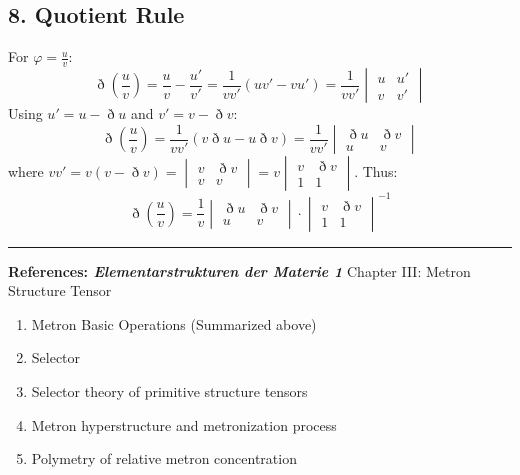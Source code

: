 \documentclass[11pt,a4paper,oneside]{article}
\newcommand{\hr}{\par\vspace{2em}\noindent\rule{\linewidth}{0.4pt}\par\vspace{2em}}
\begin{document}
\subsection{8. Quotient Rule}
For $\varphi = \frac{u}{v}$:
\begin{equation*}
    \eth \left( \frac{u}{v} \right) = \frac{u}{v} - \frac{u'}{v'} = \frac{1}{vv'}(uv' - vu') = \frac{1}{vv'} \begin{vmatrix} u & u' \\ v & v' \end{vmatrix}
\end{equation*}
Using $u' = u - \eth u$ and $v' = v - \eth v$:
\begin{equation*}
    \eth \left( \frac{u}{v} \right) = \frac{1}{vv'} (v \eth u - u \eth v) = \frac{1}{vv'} \begin{vmatrix} \eth u & \eth v \\ u & v \end{vmatrix}
\end{equation*}
where $vv' = v(v - \eth v) = \begin{vmatrix} v & \eth v \\ v & v \end{vmatrix} = v \begin{vmatrix} v & \eth v \\ 1 & 1 \end{vmatrix}$. Thus:
\begin{equation}
    \eth \left( \frac{u}{v} \right) = \frac{1}{v} \begin{vmatrix} \eth u & \eth v \\ u & v \end{vmatrix} \cdot \begin{vmatrix} v & \eth v \\ 1 & 1 \end{vmatrix}^{-1}
\end{equation}

\hr

\textbf{References: \textit{Elementarstrukturen der Materie 1}}
Chapter III: Metron Structure Tensor
\begin{enumerate}
    \item Metron Basic Operations (Summarized above)
    \item Selector
    \item Selector theory of primitive structure tensors
    \item Metron hyperstructure and metronization process
    \item Polymetry of relative metron concentration
\end{enumerate}
\end{document}
